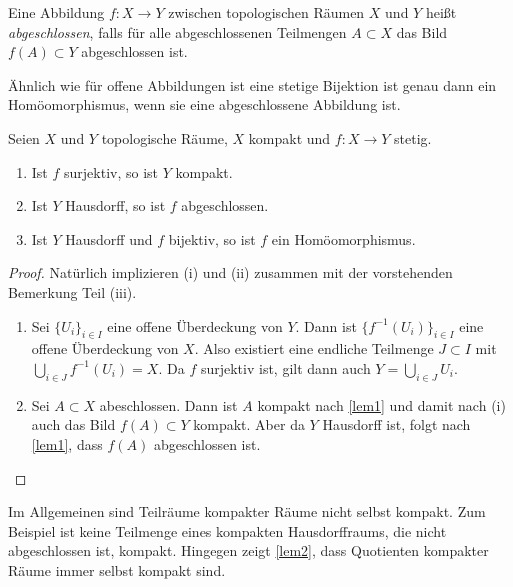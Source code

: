 \begin{definition}
Eine Abbildung $f\colon X\to Y$ zwischen topologischen Räumen $X$ und $Y$ heißt \emph{abgeschlossen}, falls für alle abgeschlossenen Teilmengen $A\subset X$ das Bild $f(A)\subset Y$ abgeschlossen ist.
\end{definition}

Ähnlich wie für offene Abbildungen ist eine stetige Bijektion ist genau dann ein Homöomorphismus, wenn sie eine abgeschlossene Abbildung ist.

\begin{lemma}\label{lem2}
Seien $X$ und $Y$ topologische Räume, $X$ kompakt und $f\colon X\to Y$ stetig.
\begin{enumerate}
\item Ist $f$ surjektiv, so ist $Y$ kompakt.
\item Ist $Y$ Hausdorff, so ist $f$ abgeschlossen.
\item Ist $Y$ Hausdorff und $f$ bijektiv, so ist $f$ ein Homöomorphismus.
\end{enumerate}
\end{lemma}
\begin{proof}
Natürlich implizieren (i) und (ii) zusammen mit der vorstehenden Bemerkung Teil (iii).
\begin{enumerate}
\item Sei $\{U_i\}_{i\in I}$ eine offene Überdeckung von $Y$. Dann ist $\{f^{-1}(U_i)\}_{i\in I}$ eine offene Überdeckung von $X$. Also existiert eine endliche Teilmenge $J\subset I$ mit $\bigcup_{i\in J} f^{-1}(U_i) = X$. Da $f$ surjektiv ist, gilt dann auch $Y = \bigcup_{i\in J} U_i$.
\item Sei $A\subset X$ abeschlossen. Dann ist $A$ kompakt nach \autoref{lem1} und damit nach (i) auch das Bild $f(A)\subset Y$ kompakt. Aber da $Y$ Hausdorff ist, folgt nach \autoref{lem1}, dass $f(A)$ abgeschlossen ist.\qedhere
\end{enumerate}
\end{proof}

Im Allgemeinen sind Teilräume kompakter Räume nicht selbst kompakt. Zum Beispiel ist keine Teilmenge eines kompakten Hausdorffraums, die nicht abgeschlossen ist, kompakt. Hingegen zeigt \autoref{lem2}, dass Quotienten kompakter Räume immer selbst kompakt sind.


